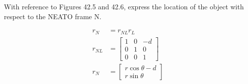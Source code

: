 With reference to Figures 42.5 and 42.6, express the location of the object with respect to the NEATO frame N.

\begin{solution}
\begin{align*}
    r_N &= r_{NL} r_L \\
    r_{NL} &= \begin{bmatrix}
        1 & 0 & -d \\
        0 & 1 & 0 \\
        0 & 0 & 1
    \end{bmatrix} \\
    r_N &= \begin{bmatrix}
        r\cos\theta - d \\
        r\sin\theta
    \end{bmatrix}
\end{align*}
\end{solution}
